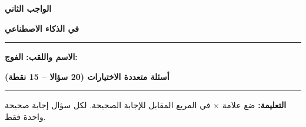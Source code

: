\documentclass[a4paper]{article}
\newif\ifcorrection
\begin{document}
\begin{center}

{\Large\khatt\textbf{الواجب الثاني}\ifcorrection\ \textbf{-- التصحيح النموذجي}\fi}

\vspace{0.2cm}

{\Large\khatt\textbf{في الذكاء الاصطناعي}}

\end{center}

\rule{\textwidth}{1pt}

\ifcorrection\else
\textbf{الاسم واللقب:} \dotfill \quad \textbf{الفوج:} \makebox[3cm]{\dotfill}

\vspace{0.3cm}
\fi

\begin{center}

{\khatt\textbf{أسئلة متعددة الاختيارات (20 سؤالا -- 15 نقطة)}}

\end{center}

\rule{\textwidth}{1pt}

\textbf{التعليمة:} ضع علامة \textbf{$\times$} في المربع المقابل للإجابة الصحيحة. لكل سؤال إجابة صحيحة واحدة فقط.

\vspace{0.3cm}
\end{document}
